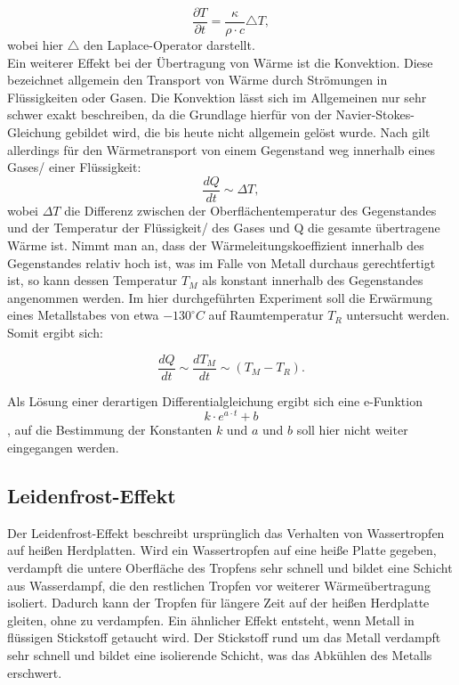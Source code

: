 \begin{equation}
\frac{\partial T}{\partial t} = \frac{\kappa}{\rho \cdot c} \triangle T, 
\label{form:leitung}
\end{equation}
wobei hier $\triangle$ den Laplace-Operator darstellt. 
\\
Ein weiterer Effekt bei der Übertragung von Wärme ist die Konvektion. Diese bezeichnet allgemein den Transport von Wärme durch Strömungen in Flüssigkeiten oder Gasen. Die Konvektion lässt sich im Allgemeinen nur sehr schwer exakt beschreiben, da die Grundlage hierfür von der Navier-Stokes-Gleichung gebildet wird, die bis heute nicht allgemein gelöst wurde. Nach \cite{praktikumwaerme} gilt allerdings für den Wärmetransport von einem Gegenstand weg innerhalb eines Gases/ einer Flüssigkeit: 
\begin{equation}
\frac{dQ}{dt} \sim \Delta T,
\end{equation}
wobei $\Delta T$ die Differenz zwischen der Oberflächentemperatur des Gegenstandes und der Temperatur der Flüssigkeit/ des Gases und Q die gesamte übertragene Wärme ist. 
Nimmt man an, dass der Wärmeleitungskoeffizient innerhalb des Gegenstandes relativ hoch ist, was im Falle von Metall durchaus gerechtfertigt ist, so kann dessen Temperatur $ T_M $ als konstant innerhalb des Gegenstandes angenommen werden. 
Im hier durchgeführten Experiment soll die Erwärmung eines Metallstabes von etwa $ -130 ^{\circ} C $ auf Raumtemperatur $T_R$ untersucht werden. Somit ergibt sich: 

\begin{equation}
\frac{dQ}{dt} \sim  \frac{dT_M}{dt} \sim (T_{M} - T_{R}). 
\label{form:konvektion1}
\end{equation}

Als Lösung einer derartigen Differentialgleichung ergibt sich eine e-Funktion 
\begin{equation}
k \cdot e^{a \cdot t} + b
\label{form:konvektion2}
\end{equation}
, auf die Bestimmung der Konstanten $k$ und $a$ und $b$ soll hier nicht weiter eingegangen werden. 

\subsection{Leidenfrost-Effekt}
Der Leidenfrost-Effekt beschreibt ursprünglich das Verhalten von Wassertropfen auf heißen Herdplatten. Wird ein Wassertropfen auf eine heiße Platte gegeben, verdampft die untere Oberfläche des Tropfens sehr schnell und bildet eine Schicht aus Wasserdampf, die den restlichen Tropfen vor weiterer Wärmeübertragung isoliert. Dadurch kann der Tropfen für längere Zeit auf der heißen Herdplatte gleiten, ohne zu verdampfen.
Ein ähnlicher Effekt entsteht, wenn Metall in flüssigen Stickstoff getaucht wird. Der Stickstoff rund um das Metall verdampft sehr schnell und bildet eine isolierende Schicht, was das Abkühlen des Metalls erschwert.
